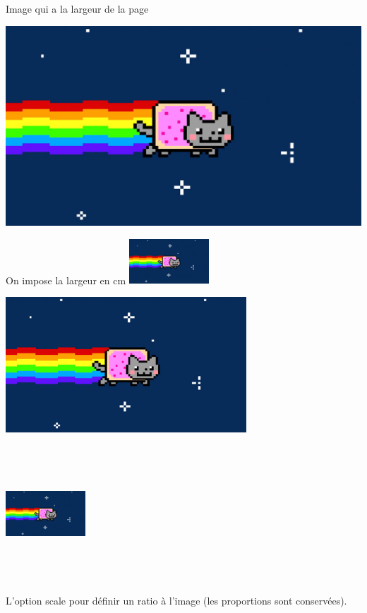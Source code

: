 \documentclass[a4paper,11pt]{article}
\begin{document}
	Image qui a la largeur de la page
	
	\includegraphics[width=\textwidth]{images/nyan-cat.png}
	
	\vspace{1cm}
	
	On impose la largeur en cm
	\includegraphics[width=3cm]{images/nyan-cat.png}
	
	\includegraphics[height=2in]{images/nyan-cat.png}
	
	\includegraphics[height=2in, width=3cm]{images/nyan-cat.png}

	L'option scale pour définir un ratio à l'image (les proportions sont conservées).
	
\end{document}
